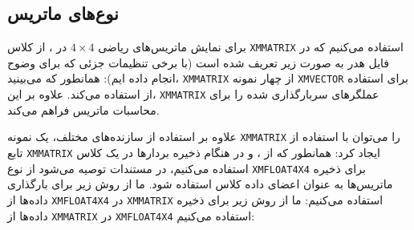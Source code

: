 \subsection{\textbf{نوع‌های ماتریس}}
\label{subsec:2.8.1}
{
    \Large
    \begin{spacing}{1.5}
        برای نمایش ماتریس‌های ریاضی $4\times 4$ در ، از کلاس \texttt{XMMATRIX} استفاده می‌کنیم که در فایل هدر  به صورت زیر تعریف شده است (با برخی تنظیمات جزئی که برای وضوح انجام داده ایم):
        \textbf{\vspace{6pt}}
        \lr{}
        \textbf{\vspace{6pt}}
        همانطور که می‌بینید، \texttt{XMMATRIX} از چهار نمونه \texttt{XMVECTOR} برای استفاده از  استفاده می‌کند. علاوه بر این، \texttt{XMMATRIX} عملگرهای سربارگذاری شده را برای محاسبات ماتریس فراهم می‌کند.

        علاوه بر استفاده از سازنده‌های مختلف، یک نمونه \texttt{XMMATRIX} را می‌توان با استفاده از تابع \texttt{XMMATRIX} ایجاد کرد:
        \textbf{\vspace{6pt}}
        \lr{}
        \textbf{\vspace{6pt}}
        همانطور که از ،  و  در هنگام ذخیره بردارها در یک کلاس استفاده می‌کنیم،
        در مستندات  توصیه می‌شود از نوع \texttt{XMFLOAT4X4} برای ذخیره ماتریس‌ها به عنوان اعضای داده کلاس استفاده شود.
        \textbf{\vspace{6pt}}
        \lr{}
        \textbf{\vspace{6pt}}
        ما از روش زیر برای بارگذاری داده‌ها از \texttt{XMFLOAT4X4} در \texttt{XMMATRIX} استفاده می‌کنیم:
        \textbf{\vspace{6pt}}
        \lr{}
        \textbf{\vspace{6pt}}
        ما از روش زیر برای ذخیره داده‌ها از \texttt{XMMATRIX} در \texttt{XMFLOAT4X4} استفاده می‌کنیم:
        \textbf{\vspace{6pt}}
        \lr{}
    \end{spacing}
}


